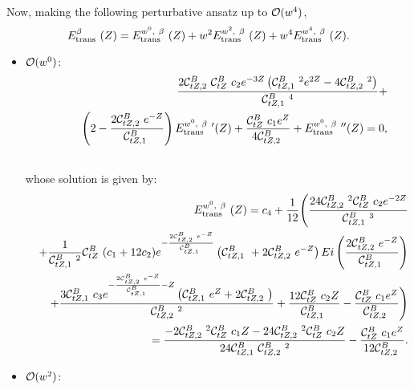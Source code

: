 Now, making the following perturbative ansatz up to ${\cal O}(w^4)$,
\begin{equation}
\label{EtransuptoW4}
E_{\rm trans}^\beta\ (Z)=E_{\rm trans}^{w^0,\ \beta}\ (Z)+w^2
   E_{\rm trans}^{w^2,\ \beta}\ (Z)+w^4 E_{\rm trans}^{w^4,\ \beta}\ (Z).
\end{equation}
\begin{itemize}
\item
${\cal O}(w^0)$:\\
{\footnotesize
\begin{eqnarray}
\label{EOMw0}
& & \frac{2 {\cal C}_{tZ,2}^B\  {\cal C}_{tZ}^B\  c_2 e^{-3 Z}
   \left({\cal C}_{tZ,1}^B\ ^2 e^{2 Z}-4
{\cal C}_{tZ,2}^B\ ^2\right)}{{\cal C}_{tZ,1}^B\ ^4}+\nonumber \\ & & \quad\quad\left(2-\frac{
   2 {\cal C}_{tZ,2}^B\  e^{-Z}}{{\cal C}_{tZ,1}^B\ }\right)
   E_{\rm trans}^{w^0,\ \beta}\ '(Z)+\frac{{\cal C}_{tZ}^B\  c_1 e^Z}{4
   {\cal C}_{tZ,2}^B\ }+E_{\rm trans}^{w^0,\ \beta}\ ''(Z) = 0,\nonumber\\
& &    
\end{eqnarray}
}
whose solution is given by:
{\footnotesize
\begin{eqnarray}
\label{EOMw0-sol}
& & \hskip -0.8in E_{\rm trans}^{w^0,\ \beta}\ (Z) = c_4 +  \frac{1}{12} \Biggl(\frac{24
   {\cal C}_{tZ,2}^B\ ^2 {\cal C}_{tZ}^B\  c_2 e^{-2
Z}}{{\cal C}_{tZ,1}^B\ ^3} \nonumber \\ & & +\frac{1}{{\cal C}_{tZ,1}^B\ ^2}{\cal C}_{tZ}^B\  (c_1+12 c_2)
   e^{-\frac{2 {\cal C}_{tZ,2}^B\  e^{-Z}}{{\cal C}_{tZ,1}^B\ }}
   \left({\cal C}_{tZ,1}^B\ +2 {\cal C}_{tZ,2}^B\  e^{-Z}\right)
   {Ei}\left(\frac{2 {\cal C}_{tZ,2}^B\ 
   e^{-Z}}{{\cal C}_{tZ,1}^B\ }\right)\nonumber\\
 & &   +\frac{3
   {\cal C}_{tZ,1}^B\  c_3 e^{-\frac{2 {\cal C}_{tZ,2}^B\ 
   e^{-Z}}{{\cal C}_{tZ,1}^B\ }-Z} \left({\cal C}_{tZ,1}^B\  e^Z+2
   {\cal C}_{tZ,2}^B\ \right)}{{\cal C}_{tZ,2}^B\ ^2}+\frac{12
   {\cal C}_{tZ}^B\  c_2
   Z}{{\cal C}_{tZ,1}^B\ }-\frac{{\cal C}_{tZ}^B\  c_1
   e^Z}{{\cal C}_{tZ,2}^B\ }\Biggr) \nonumber\\
& & = \frac{-2 {\cal C}_{tZ,2}^B\ ^2 {\cal C}_{tZ}^B\  c_1 Z-24
   {\cal C}_{tZ,2}^B\ ^2 {\cal C}_{tZ}^B\  c_2 Z}{24
   {\cal C}_{tZ,1}^B\  {\cal C}_{tZ,2}^B\ ^2}-\frac{{\cal C}_{tZ}^B\ 
   c_1 e^Z}{12 {\cal C}_{tZ,2}^B\ }.
\end{eqnarray}
}
\item
${\cal O}(w^2)$:\\
{\scriptsize
\begin{eqnarray}

\end{eqnarray}}
\end{itemize}
